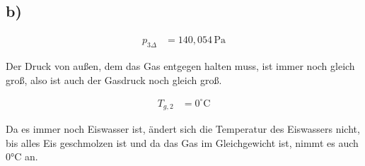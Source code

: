 

\subsection*{b)}
\begin{align*}
p_{3\Delta} &= 140{,}054 \, \text{Pa}
\end{align*}

Der Druck von außen, dem das Gas entgegen halten muss, ist immer noch gleich groß, also ist auch der Gasdruck noch gleich groß.

\begin{align*}
T_{g,2} &= 0^\circ \text{C}
\end{align*}

Da es immer noch Eiswasser ist, ändert sich die Temperatur des Eiswassers nicht, bis alles Eis geschmolzen ist und da das Gas im Gleichgewicht ist, nimmt es auch 0°C an.